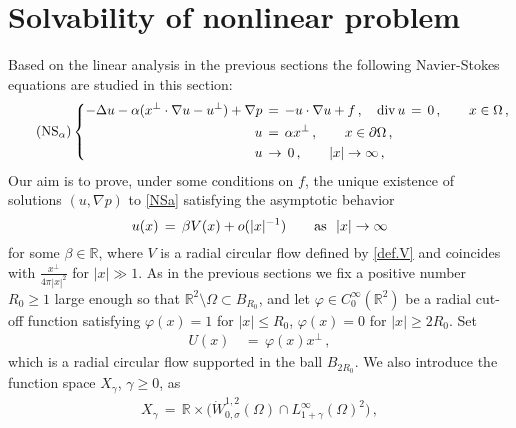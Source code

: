 \documentclass[11pt,a4paper]{article}
\newcommand{\R}{\mathbb{R}}
\begin{document}

\section{Solvability of nonlinear problem}\label{sec.nonlinear}

Based on the linear analysis in the previous sections the following Navier-Stokes equations are studied in this section:
%
\begin{equation}\tag{NS$_{\alpha}$}\label{NSa}
  \left\{\begin{aligned}
  -\Delta u - \alpha ( x^\bot \cdot \nabla u - u^\bot ) + \nabla p  &\,=\, - u\cdot\nabla u  + f \,, 
  \quad {\rm div}\, u \,=\, 0\,,  ~~~~~~   x \in \Omega\,, \\
 u  & \, =\,  \alpha x^\bot   \,,  ~~~~~~ x\in \partial\Omega\,, \\
 u  & \, \rightarrow \,     0   \,,  ~~~~~~ |x| \rightarrow \infty\,,
\end{aligned}\right.
\end{equation}
%
Our aim is to prove, under some conditions on $f$, the unique existence of solutions $(u,\nabla p)$ to \eqref{NSa} satisfying the asymptotic behavior 
%
\begin{equation*}
u (x) \, = \, \beta V(x) + o(|x|^{-1})
\qquad {\rm as} ~\ |x| \rightarrow \infty
\end{equation*}
%
for some $\beta \in \R$, where $V$ is a radial circular flow defined by \eqref{def.V} and coincides with $\frac{x^\bot}{4\pi |x|^2}$ for $|x|\gg 1$. As in the previous sections we fix a positive number $R_0\geq 1$ large enough so that $\R^2\setminus \Omega \subset B_{R_0}$, and let $\varphi \in C^\infty_0 (\R^2)$ be a radial cut-off function satisfying 
$\varphi(x) = 1 $ for $|x| \le R_0$, $\varphi (x)=0$ for $|x|\geq 2 R_0$. Set 
%
\begin{align}
U(x) & \, = \, \varphi (x) x^\bot\,, \label{def.U}
\end{align}
%
which is a radial circular flow supported in the ball $B_{2R_0}$. We also introduce the function space $X_{\gamma}$, $\gamma \geq 0$, as 
%
\begin{align}\label{def.X_gamma}
X_{\gamma} \, = \, 
\R  \times \big (\dot{W}^{1,2}_{0,\sigma} (\Omega) \cap L^\infty_{1+\gamma} (\Omega)^2 \big )\,,
\end{align}
\end{document}
